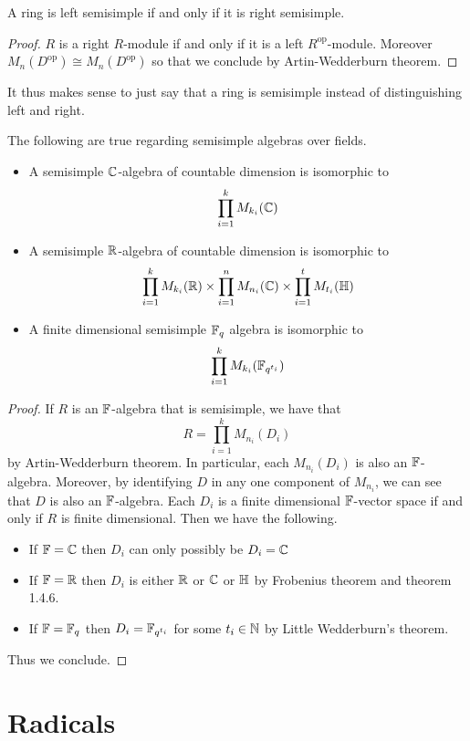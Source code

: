 \documentclass[a4paper]{article}
\begin{document}
\begin{crl}{}{} A ring is left semisimple if and only if it is right semisimple. \tcbline
\begin{proof}
$R$ is a right $R$-module if and only if it is a left $R^{\text{op}}$-module. Moreover $M_n(D^\text{op})\cong M_n(D^\text{op})$ so that we conclude by Artin-Wedderburn theorem. 
\end{proof}
\end{crl}

It thus makes sense to just say that a ring is semisimple instead of distinguishing left and right. 

\begin{prp}{}{} The following are true regarding semisimple algebras over fields. 
\begin{itemize}
\item A semisimple $\mathbb{C}$-algebra of countable dimension is isomorphic to $$\prod_{i=1}^kM_{k_i}(\mathbb{C})$$
\item A semisimple $\mathbb{R}$-algebra of countable dimension is isomorphic to $$\prod_{i=1}^kM_{k_i}(\mathbb{R})\times\prod_{i=1}^nM_{n_i}(\mathbb{C})\times\prod_{i=1}^tM_{t_i}(\mathbb{H})$$
\item A finite dimensional semisimple $\mathbb{F}_q$ algebra is isomorphic to $$\prod_{i=1}^k M_{k_i}(\mathbb{F}_{q^{t_i}})$$
\end{itemize} \tcbline
\begin{proof}
If $R$ is an $\mathbb{F}$-algebra that is semisimple, we have that $$R=\prod_{i=1}^kM_{n_i}(D_i)$$ by Artin-Wedderburn theorem. In particular, each $M_{n_i}(D_i)$ is also an $\mathbb{F}$-algebra. Moreover, by identifying $D$ in any one component of $M_{n_i}$, we can see that $D$ is also an $\mathbb{F}$-algebra. Each $D_i$ is a finite dimensional $\mathbb{F}$-vector space if and only if $R$ is finite dimensional. Then we have the following. 
\begin{itemize}
\item If $\mathbb{F}=\mathbb{C}$ then $D_i$ can only possibly be $D_i=\mathbb{C}$
\item If $\mathbb{F}=\mathbb{R}$ then $D_i$ is either $\mathbb{R}$ or $\mathbb{C}$ or $\mathbb{H}$ by Frobenius theorem and theorem 1.4.6. 
\item If $\mathbb{F}=\mathbb{F}_{q}$ then $D_i=\mathbb{F}_{q^{t_i}}$ for some $t_i\in\mathbb{N}$ by Little Wedderburn's theorem. 
\end{itemize}
Thus we conclude. 
\end{proof}
\end{prp}

\pagebreak
\section{Radicals}
\end{document}
